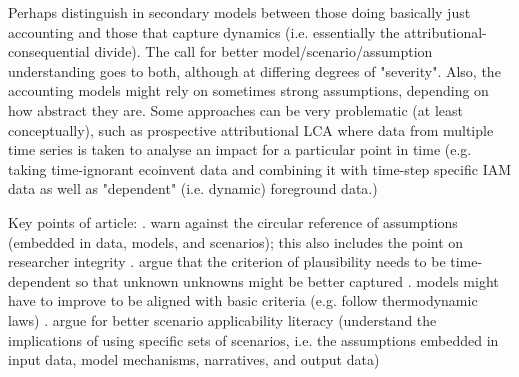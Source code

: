 \documentclass{article}
\begin{document}
Perhaps distinguish in secondary models between those doing basically just accounting and those that capture dynamics (i.e. essentially the attributional-consequential divide). The call for better model/scenario/assumption understanding goes to both, although at differing degrees of "severity". Also, the accounting models might rely on sometimes strong assumptions, depending on how abstract they are. Some approaches can be very problematic (at least conceptually), such as prospective attributional LCA where data from multiple time series is taken to analyse an impact for a particular point in time (e.g. taking time-ignorant ecoinvent data and combining it with time-step specific IAM data as well as "dependent" (i.e. dynamic) foreground data.)

Key points of article:
. warn against the circular reference of assumptions (embedded in data, models, and scenarios); this also includes the point on researcher integrity
. argue that the criterion of plausibility needs to be time-dependent so that unknown unknowns might be better captured
. models might have to improve to be aligned with basic criteria (e.g. follow thermodynamic laws)
. argue for better scenario applicability literacy (understand the implications of using specific sets of scenarios, i.e. the assumptions embedded in input data, model mechanisms, narratives, and output data)
\end{document}
